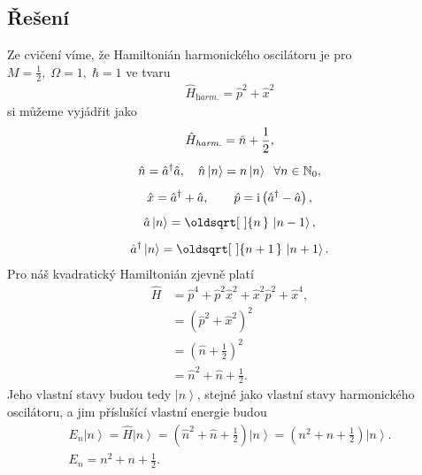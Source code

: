 \documentclass[10pt,a4paper]{article}
\renewcommand*{\sqrt}[2][\ ]{\oldsqrt[#1]{#2\,}\,}
\newcommand{\const}[1]{\text{#1}}
\newcommand{\ket}[1]{\left| #1 \right>}
\renewcommand{\i}{\const{i}}
\begin{document}
\subsection{Řešení}
Ze cvičení víme, že Hamiltonián harmonického oscilátoru je pro $M=\frac{1}{2}, \; \Omega = 1, \; \hbar = 1$ ve tvaru
\begin{align*}
    \hat{H}_\textit{harm.} = \hat{p}^2 + \hat{x}^2
\end{align*}
si můžeme vyjádřit jako
\begin{gather*}
    \hat{H}_\textit{harm.} = \hat{n} + \frac{1}{2},
    \\[5pt]
    \hat{n} = \hat{a}^\dagger \hat{a},
    \hspace{1em}
    \hat{n} \ket{n} =  n \ket{n}
    \;\; \forall n \in \mathbb{N}_0,
    \\[5pt]
    \hat{x} = \hat{a}^\dagger + \hat{a},
    \hspace{2em}
    \hat{p} = \i \left( \hat{a}^\dagger - \hat{a} \right),
    \\[5pt]
    \hat{a} \ket{n} = \sqrt{n} \ket{n-1},
    \\[5pt]
    \hat{a}^\dagger \ket{n} = \sqrt{n+1} \ket{n+1}.
\end{gather*}
Pro náš kvadratický Hamiltonián zjevně platí
\begin{align*}
    \hat{H}
    &= \hat{p}^4
    + \hat{p}^2 \hat{x}^2
    + \hat{x}^2 \hat{p}^2
    + \hat{x}^4,
    \\[5pt]
    &= \left( \hat{p}^2 + \hat{x}^2 \right)^2 \\[5pt]
    &= \left( \hat{n} + \frac{1}{2} \right)^2 \\[5pt]
    &= \hat{n}^2 + \hat{n} + \frac{1}{2}.
\end{align*}
Jeho vlastní stavy budou tedy $\ket{n}$, stejné jako vlastní stavy harmonického oscilátoru, a jim příslušící vlastní energie budou
\begin{gather*}
    E_n \ket{n}
    = \hat{H} \ket{n}
    = \left( \hat{n}^2 + \hat{n} + \frac{1}{2} \right) \ket{n}
    = \left( n^2 + n + \frac{1}{2} \right) \ket{n}.
    \\[15pt]
    E_n = n^2 + n + \frac{1}{2}.
\end{gather*}
\end{document}

